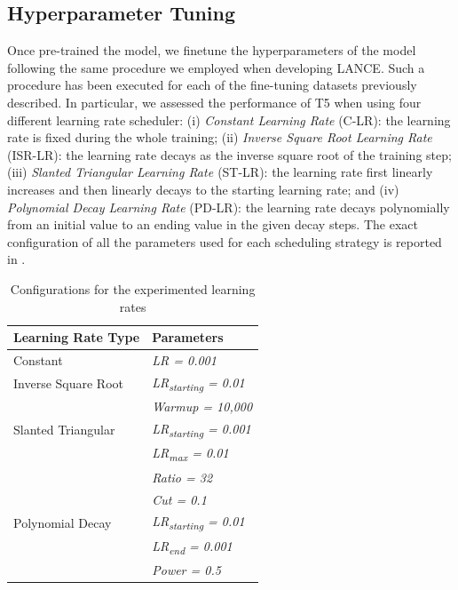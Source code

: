 \subsection{Hyperparameter Tuning}
Once pre-trained the model, we finetune the hyperparameters of the model following the same procedure we employed when developing LANCE. Such a procedure has been executed for each of the fine-tuning datasets previously described. In particular, we assessed the performance of T5 when using four different learning rate scheduler: (i) \textit{Constant Learning Rate} (C-LR): the learning rate is fixed during the whole training; (ii) \textit{Inverse Square Root Learning Rate} (ISR-LR): the learning rate decays as the inverse square root of the training step; (iii) \textit{Slanted Triangular Learning Rate \cite{howard2018universal}} (ST-LR): the learning rate first linearly increases and then linearly decays to the starting learning rate; and (iv) \textit{Polynomial Decay Learning Rate} (PD-LR): the learning rate decays polynomially from an initial value to an ending value in the given decay steps. 
The exact configuration of all the parameters used for each scheduling strategy is reported in .


\begin{table}[h]
	\centering
	\caption{Configurations for the experimented learning rates}
	\begin{tabular}{ll}
		\hline
		\textbf{Learning Rate Type} & \textbf{Parameters}               \\ \hline
		Constant                     & \textit{LR = 0.001}               \\
		Inverse Square Root         & \textit{LR\textsubscript{starting} = 0.01}  \\
		& \textit{Warmup = 10,000}          \\
		Slanted Triangular          & \textit{LR\textsubscript{starting} = 0.001} \\
		& \textit{LR\textsubscript{max} = 0.01}       \\
		& \textit{Ratio = 32}               \\
		& \textit{Cut = 0.1}                \\
		Polynomial Decay            & \textit{LR\textsubscript{starting} = 0.01}  \\
		& \textit{LR\textsubscript{end} = 0.001}      \\
		& \textit{Power = 0.5}              \\ \hline
	\end{tabular}
	\label{tab:learning-rates}
\end{table}

